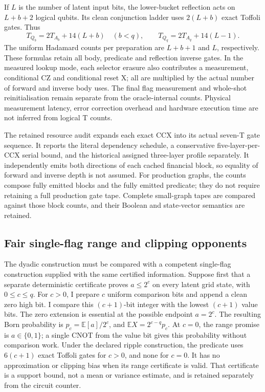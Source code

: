 If \(L\) is the number of latent input bits, the lower-bucket reflection
acts on \(L+b+2\) logical qubits. Its clean conjunction ladder uses
\(2(L+b)\) exact Toffoli gates. Thus
\[
 T_{Q_b}=2T_{A_b}+14(L+b)\quad(b<q),\qquad
 T_{Q_q}=2T_{A_q}+14(L-1).                                 \tag{V8}
\]
The uniform Hadamard counts per preparation are \(L+b+1\) and \(L\),
respectively. These formulas retain all body, predicate and reflection
inverse gates. In the measured lookup mode, each selector erasure also
contributes a measurement, conditional CZ and conditional reset X; all
are multiplied by the actual number of forward and inverse body uses.
The final flag measurement and whole-shot reinitialisation remain separate
from the oracle-internal counts. Physical measurement latency, error
correction overhead and hardware execution time are not inferred from
logical T counts.

The retained resource audit expands each exact CCX into its actual seven-T
gate sequence. It reports the literal dependency schedule, a conservative
five-layer-per-CCX serial bound, and the historical assigned three-layer
profile separately. It independently emits both directions of each cached
financial block, so equality of forward and inverse depth is not assumed.
For production graphs, the counts compose fully emitted blocks and the
fully emitted predicate; they do not require retaining a full production
gate tape. Complete small-graph tapes are compared against those block
counts, and their Boolean and state-vector semantics are retained.

\subsection{Fair single-flag range and clipping opponents}

The dyadic construction must be compared with a competent single-flag
construction supplied with the same certified information. Suppose first
that a separate deterministic certificate proves \(a\leq2^c\) on every
latent grid state, with \(0\leq c\leq q\). For \(c>0\), I prepare
\(c\) uniform comparison bits and append a clean zero high bit. I compare
this \((c+1)\)-bit integer with the lowest \((c+1)\) value bits.
The zero extension is essential at the possible endpoint \(a=2^c\).
The resulting Born probability is \(p_c=\mathbb E[a]/2^c\), and
\(\mathbb E X=2^{c-q}p_c\). At \(c=0\), the range promise is
\(a\in\{0,1\}\); a single CNOT from the value bit gives this
probability without comparison work. Under the declared ripple construction,
the predicate uses \(6(c+1)\) exact Toffoli gates for \(c>0\),
and none for \(c=0\). It has no approximation or clipping bias when its
range certificate is valid. That certificate is a support bound, not a
mean or variance estimate, and is retained separately from the circuit counter.

